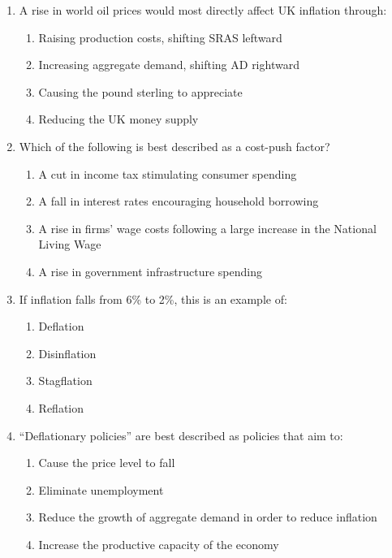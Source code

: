 \documentclass[12pt,a4paper]{article}
\begin{document}
\begin{enumerate}[leftmargin=*, label=\textbf{\arabic*.}]
    \vspace{0.4em}

    \item A rise in world oil prices would most directly affect UK inflation through:
    \begin{enumerate}[label=(\Alph*), topsep=2pt]
        \item Raising production costs, shifting SRAS leftward
        \item Increasing aggregate demand, shifting AD rightward
        \item Causing the pound sterling to appreciate
        \item Reducing the UK money supply
    \end{enumerate}

    \vspace{0.4em}

    \item Which of the following is best described as a cost-push factor?
    \begin{enumerate}[label=(\Alph*), topsep=2pt]
        \item A cut in income tax stimulating consumer spending
        \item A fall in interest rates encouraging household borrowing
        \item A rise in firms' wage costs following a large increase in the National Living Wage
        \item A rise in government infrastructure spending
    \end{enumerate}

    \vspace{0.4em}

    \item If inflation falls from 6\% to 2\%, this is an example of:
    \begin{enumerate}[label=(\Alph*), topsep=2pt]
        \item Deflation
        \item Disinflation
        \item Stagflation
        \item Reflation
    \end{enumerate}

    \vspace{0.4em}

    \item ``Deflationary policies'' are best described as policies that aim to:
    \begin{enumerate}[label=(\Alph*), topsep=2pt]
        \item Cause the price level to fall
        \item Eliminate unemployment
        \item Reduce the growth of aggregate demand in order to reduce inflation
        \item Increase the productive capacity of the economy
    \end{enumerate}


\end{enumerate}
\end{document}

